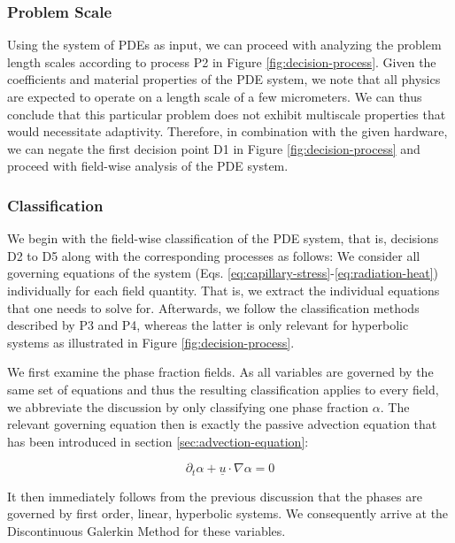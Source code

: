\documentclass[sn-mathphys,Numbered]{sn-jnl}%
\theoremstyle{thmstyleone}%
\theoremstyle{thmstyletwo}%
\theoremstyle{thmstylethree}%
\begin{document}
\subsubsection{Problem Scale}

Using the system of PDEs as input, we can proceed with analyzing the problem length scales according to process P2 in Figure \ref{fig:decision-process}.
Given the coefficients and material properties of the PDE system, we note that all physics are expected to operate on a length scale of a few micrometers.
We can thus conclude that this particular problem does not exhibit multiscale properties that would necessitate adaptivity.
Therefore, in combination with the given hardware, we can negate the first decision point D1 in Figure \ref{fig:decision-process} and proceed with field-wise analysis of the PDE system.

\subsubsection{Classification}

We begin with the field-wise classification of the PDE system, that is,  decisions D2 to D5 along with the corresponding processes as follows:
We consider all governing equations of the system (Eqs. \ref{eq:capillary-stress}-\ref{eq:radiation-heat}) individually for each field quantity. That is, we extract the individual equations that one needs to solve for.
Afterwards, we follow the classification methods described by P3 and P4, whereas the latter is only relevant for hyperbolic systems as illustrated in Figure \ref{fig:decision-process}.

We first examine the phase fraction fields.
As all variables are governed by the same set of equations and thus the resulting classification applies to every field, we abbreviate the discussion by only classifying one phase fraction $\alpha$.
The relevant governing equation then is exactly the passive advection equation that has been introduced in section \ref{sec:advection-equation}:

\begin{equation}
    \partial_t \alpha + \underline{u} \cdot \nabla \alpha = 0
\end{equation}

It then immediately follows from the previous discussion that the phases are governed by first order, linear, hyperbolic systems.
We consequently arrive at the Discontinuous Galerkin Method for these variables.
\end{document}
